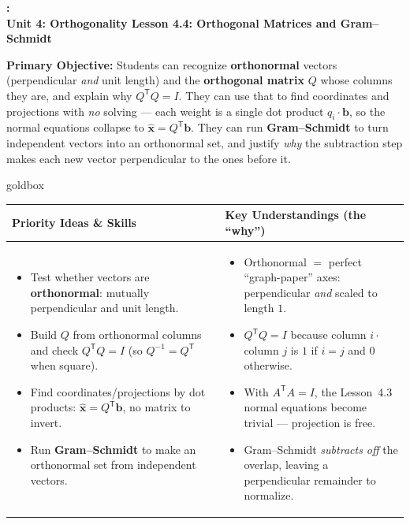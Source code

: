 \documentclass[10pt]{article}
\newcommand{\xx}{\mathbf{x}}
\newcommand{\bb}{\mathbf{b}}
\newcommand{\T}{\mathsf{T}}
\newcommand{\UnitNumberName}{Unit 4: Orthogonality \quad}
\newcommand{\LessonNumberName}{Lesson 4.4: Orthogonal Matrices and Gram--Schmidt}
\begin{document}
\begin{center}
    {\Large\bfseries \CourseName: \SchoolYear \\
    {\small\bfseries \UnitNumberName \LessonNumberName}}
\end{center}

\begin{tcolorbox}[colback=blush, colframe=burgundy, boxrule=0.9pt, arc=2mm,
    left=2mm, right=2mm, top=1.5mm, bottom=1.5mm]
    \textbf{Primary Objective:} Students can recognize \textbf{orthonormal} vectors (perpendicular
    \emph{and} unit length) and the \textbf{orthogonal matrix} $Q$ whose columns they are, and explain
    why $Q^{\T}Q=I$. They can use that to find coordinates and projections with \emph{no} solving --- each
    weight is a single dot product $q_i\cdot\bb$, so the normal equations collapse to $\hat{\xx}=Q^{\T}\bb$.
    They can run \textbf{Gram--Schmidt} to turn independent vectors into an orthonormal set, and justify
    \emph{why} the subtraction step makes each new vector perpendicular to the ones before it.
\end{tcolorbox}

\renewcommand{\arraystretch}{1.4}
\begin{skillbox}{goldbox}
\begin{tabularx}{\linewidth}{@{}X|X@{}}
\textbf{Priority Ideas \& Skills} & \textbf{Key Understandings (the ``why'')} \\[2pt]
\hline
\vspace{-6pt}
\begin{itemize}[leftmargin=1.1em, nosep, after=\vspace{2pt}]
  \item Test whether vectors are \textbf{orthonormal}: mutually perpendicular and unit length.
  \item Build $Q$ from orthonormal columns and check $Q^{\T}Q=I$ (so $Q^{-1}=Q^{\T}$ when square).
  \item Find coordinates/projections by dot products: $\hat{\xx}=Q^{\T}\bb$, no matrix to invert.
  \item Run \textbf{Gram--Schmidt} to make an orthonormal set from independent vectors.
\end{itemize}
&
\vspace{-6pt}
\begin{itemize}[leftmargin=1.1em, nosep, after=\vspace{2pt}]
  \item Orthonormal $=$ perfect ``graph-paper'' axes: perpendicular \emph{and} scaled to length $1$.
  \item $Q^{\T}Q=I$ because column $i\cdot$ column $j$ is $1$ if $i=j$ and $0$ otherwise.
  \item With $A^{\T}A=I$, the Lesson~4.3 normal equations become trivial --- projection is free.
  \item Gram--Schmidt \emph{subtracts off} the overlap, leaving a perpendicular remainder to normalize.
\end{itemize}
\end{tabularx}
\end{skillbox}
\end{document}
